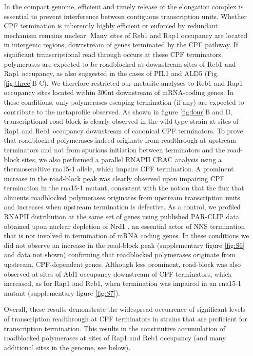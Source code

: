 In the compact \cer{} genome, efficient and timely release of the elongation complex is essential to prevent interference between contiguous transcription units. Whether CPF termination is inherently highly efficient or enforced by redundant mechanism remains unclear. Many sites of Reb1 and Rap1 occupancy are located in intergenic regions, downstream of genes terminated by the CPF pathway. If significant transcriptional read through occurs at these CPF terminators, polymerases are expected to be roadblocked at downstream sites of Reb1 and Rap1 occupancy, as also suggested in the cases of PIL1 and ALD5 (Fig.  \ref{fig:three}B-C). We therefore restricted our metasite analyses to Reb1 and Rap1 occupancy sites located within 300nt downstream of mRNA-coding genes. In these conditions, only polymerases escaping termination (if any) are expected to contribute to the metaprofile observed. As shown in figure \ref{fig:four}B and D, transcriptional road-block is clearly observed in the wild type strain at sites of Rap1 and Reb1 occupancy downstream of canonical CPF terminators. To prove that roadblocked polymerases indeed originate from readthrough at upstream terminators and not from spurious initiation between terminators and the road-block sites, we also performed a parallel RNAPII CRAC analysis using a thermosensitive rna15-1 allele, which impairs CPF termination.  A prominent increase in the road-block peak was clearly observed upon impairing CPF termination in the rna15-1 mutant, consistent with the notion that the flux that aliments roadblocked polymerases originates from upstream transcription units and increases when upstream termination is defective. As a control, we profiled RNAPII distribution at the same set of genes using published PAR-CLIP data obtained upon nuclear depletion of Nrd1 \cite{schaughency:2014:genomewide}, an essential actor of NNS termination that is not involved in termination of mRNA coding genes. In these conditions we did not observe an increase in the road-block peak (supplementary figure \ref{fig:S6} and data not shown) confirming that roadblocked polymerases originate from upstream, CPF-dependent genes. 
Although less prominent, road-block was also observed at sites of Abf1 occupancy downstream of CPF terminators, which increased, as for Rap1 and Reb1, when termination was impaired in an rna15-1 mutant (supplementary figure \ref{fig:S7}). 

Overall, these results demonstrate the widespread occurrence of significant levels of transcription readthrough at CPF terminators in strains that are proficient for transcription termination. This results in the constitutive accumulation of roadblocked polymerases at sites of Rap1 and Reb1 occupancy (and many additional sites in the genome, see below).


